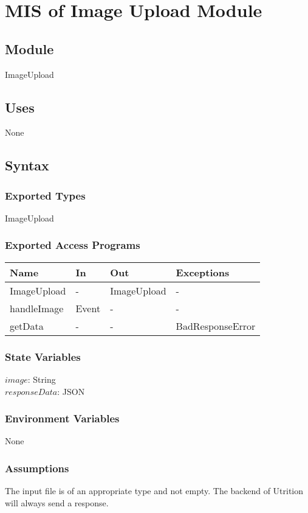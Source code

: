 \documentclass[12pt, titlepage]{article}
\begin{document}
\newpage

\section{MIS of Image Upload Module} \label{ImageUpload} 
\subsection{Module}
ImageUpload
\subsection{Uses}
None
\subsection{Syntax}
\subsubsection{Exported Types}
ImageUpload
\subsubsection{Exported Access Programs}
\begin{center}
	\begin{tabular}{p{3cm} p{4cm} p{4cm} p{3cm}}
		\hline
		\textbf{Name} & \textbf{In} & \textbf{Out} & \textbf{Exceptions} \\
		\hline
		ImageUpload & - & ImageUpload &- \\
		handleImage & Event & - & - \\
		getData & - & - & BadResponseError \\
		\hline
	\end{tabular}
\end{center}
\subsubsection{State Variables}
$image$: String\\
$responseData$: JSON
\subsubsection{Environment Variables}
None
\subsubsection{Assumptions}
The input file is of an appropriate type and not empty. The backend of Utrition will always send a response.
\end{document}
